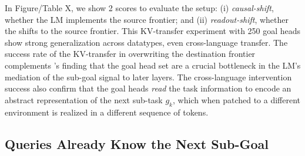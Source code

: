 In {\color{red} Figure/Table X}, we show 2 scores to evaluate the setup: (i) \emph{causal-shift}, whether the LM implements the source frontier; and (ii) \emph{readout-shift}, whether the \goalscope shifts to the source frontier. This KV-transfer experiment with 250 goal heads show strong generalization across datatypes, even cross-language transfer. The success rate of the KV-transfer in overwriting the destination frontier complements 's finding that the goal head set are a crucial bottleneck in the LM's mediation of the sub-goal signal to later layers. The cross-language intervention success also confirm that the goal heads \emph{read} the task information to encode an abstract representation of the next sub-task $g_k$, which when patched to a different environment is realized in a different sequence of tokens. 

% 



\subsection{Queries Already Know the Next Sub-Goal}
\label{sec:mechanism:precommit}
\label{sec:steer:q-transfer}

